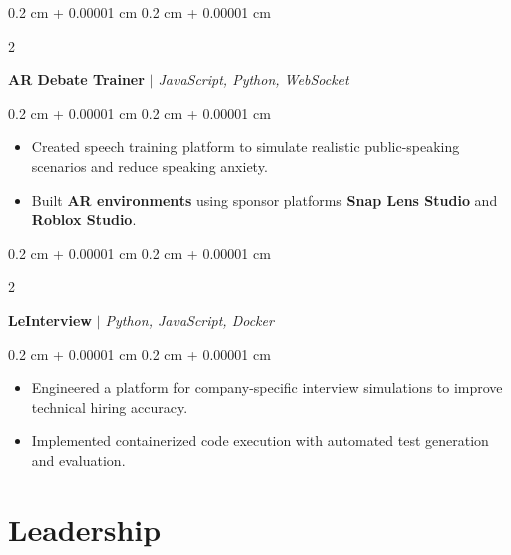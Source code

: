 \documentclass[10pt, letterpaper]{article}
\newenvironment{highlights}{
    \begin{itemize}[
        topsep=0.10 cm,
        parsep=0.10 cm,
        partopsep=0pt,
        itemsep=0pt,
        leftmargin=0.4 cm + 10pt
    ]
}{
    \end{itemize}
} %
\newenvironment{onecolentry}{
    \begin{adjustwidth}{
        0.2 cm + 0.00001 cm
    }{
        0.2 cm + 0.00001 cm
    }
}{
    \end{adjustwidth}
} %
\newenvironment{twocolentry}[2][]{
    \onecolentry
    \def\secondColumn{#2}
    \setcolumnwidth{\fill, 5.6 cm}
    \begin{paracol}{2}
}{
    \switchcolumn \raggedleft \secondColumn
    \end{paracol}
    \endonecolentry
} %
\let\hrefWithoutArrow\href
\renewcommand{\href}[2]{\hrefWithoutArrow{#1}{\ifthenelse{\equal{#2}{}}{ }{#2 }\raisebox{.15ex}{\footnotesize \faExternalLink*}}}
\begin{document}
        \vspace{0.3 cm}

        \begin{twocolentry}{}
            \textbf{AR Debate Trainer} \textit{ $|$ JavaScript, Python, WebSocket}
            \href{https://github.com/rob-9/punchline}{}
        \end{twocolentry}

        \vspace{0.10 cm}
        \begin{onecolentry}
            \begin{highlights}
                \item Created speech training platform to simulate realistic public-speaking scenarios and reduce speaking anxiety.
                \item Built \textbf{AR environments} using sponsor platforms \textbf{Snap Lens Studio} and \textbf{Roblox Studio}.
            \end{highlights}
        \end{onecolentry}


        \vspace{0.3 cm}

        \begin{twocolentry}{}
            \textbf{LeInterview} \textit{ $|$ Python, JavaScript, Docker}
            \href{https://github.com/rob-9/LeInterview}{}
        \end{twocolentry}

        \vspace{0.10 cm}
        \begin{onecolentry}
            \begin{highlights}
                \item Engineered a platform for company-specific interview simulations to improve technical hiring accuracy.
                \item Implemented containerized code execution with automated test generation and evaluation.
            \end{highlights}
        \end{onecolentry}


    \section{Leadership}
\end{document}

